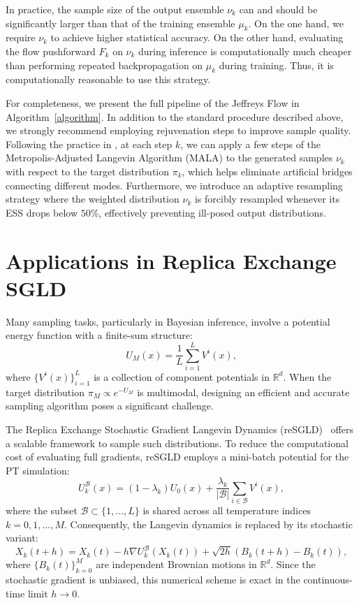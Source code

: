 \documentclass[%
 reprint,
 amsmath,amssymb,
 aps,
 pre,
]{revtex4-2}
\begin{document}
In practice, the sample size of the output ensemble $\nu_k$ can and should be significantly larger than that of the training ensemble $\mu_k$. On the one hand, we require $\nu_k$ to achieve higher statistical accuracy. On the other hand, evaluating the flow pushforward $F_k$ on $\nu_k$ during inference is computationally much cheaper than performing repeated backpropagation on $\mu_k$ during training. Thus, it is computationally reasonable to use this strategy.

For completeness, we present the full pipeline of the Jeffreys Flow in Algorithm~\ref{algorithm}. In addition to the standard procedure described above, we strongly recommend employing rejuvenation steps to improve sample quality. Following the practice in \cite{wu2020stochastic}, at each step $k$, we can apply a few steps of the Metropolis-Adjusted Langevin Algorithm (MALA) to the generated samples $\nu_k$ with respect to the target distribution $\pi_k$, which helps eliminate artificial bridges connecting different modes. Furthermore, we introduce an adaptive resampling strategy where the weighted distribution $\nu_k$ is forcibly resampled whenever its ESS drops below $50\%$, effectively preventing ill-posed output distributions.

\section{Applications in Replica Exchange SGLD}
\label{section: reSGLD}

Many sampling tasks, particularly in Bayesian inference, involve a potential energy function with a finite-sum structure:
\begin{equation}
	U_M(x) = \frac{1}{L} \sum_{i=1}^L V^i(x),
\end{equation}
where $\{V^i(x)\}_{i=1}^L$ is a collection of component potentials in $\mathbb{R}^d$. When the target distribution $\pi_M \propto e^{-U_M}$ is multimodal, designing an efficient and accurate sampling algorithm poses a significant challenge.

The Replica Exchange Stochastic Gradient Langevin Dynamics (reSGLD)~\cite{deng2020accelerating} offers a scalable framework to sample such distributions. To reduce the computational cost of evaluating full gradients, reSGLD employs a mini-batch potential for the PT simulation:
\begin{equation}
	U_k^{\mathcal B}(x) = (1-\lambda_k) U_0(x) + \frac{\lambda_k}{|\mathcal B|} \sum_{i\in\mathcal B} V^i(x),
\end{equation}
where the subset $\mathcal B \subset \{1,\dots,L\}$ is shared across all temperature indices $k=0,1,\dots,M$. Consequently, the Langevin dynamics is replaced by its stochastic variant:
\begin{equation*}
    X_k(t + h) = X_k(t) - h \nabla U_k^{\mathcal B}(X_k(t)) + \sqrt{2h}(B_k(t + h) - B_k(t)),
\end{equation*}
where $\{B_k(t)\}_{k=0}^M$ are independent Brownian motions in $\mathbb{R}^d$. Since the stochastic gradient is unbiased, this numerical scheme is exact in the continuous-time limit $h \to 0$.
\end{document}
